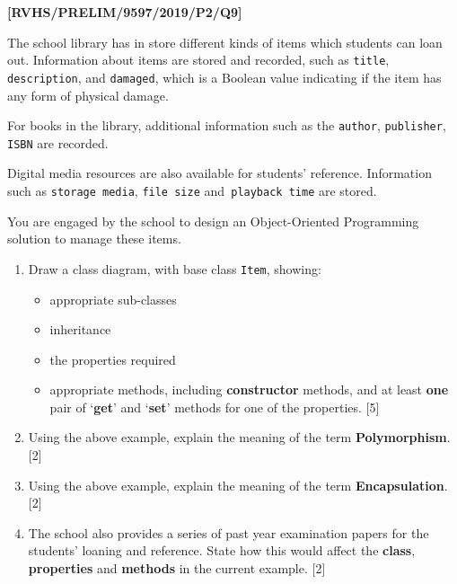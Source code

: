 \item \textbf{{[}RVHS/PRELIM/9597/2019/P2/Q9{]} }

The school library has in store different kinds of items which students
can loan out. Information about items are stored and recorded, such
as \texttt{title}, \texttt{description}, and \texttt{damaged}, which
is a Boolean value indicating if the item has any form of physical
damage.

For books in the library, additional information such as the \texttt{author},
\texttt{publisher}, \texttt{ISBN} are recorded.

Digital media resources are also available for students\textquoteright{}
reference. Information such as \texttt{storage media}, \texttt{file
size} and\texttt{ playback time} are stored. 

You are engaged by the school to design an Object-Oriented Programming
solution to manage these items.
\begin{enumerate}
\item Draw a class diagram, with base class \texttt{Item}, showing: 
\begin{itemize}
\item appropriate sub-classes 
\item inheritance
\item the properties required 
\item appropriate methods, including \textbf{constructor} methods, and at
least \textbf{one} pair of \textquoteleft \textbf{get}\textquoteright{}
and \textquoteleft \textbf{set}\textquoteright{} methods for one of
the properties. \hfill{}{[}5{]}
\end{itemize}
\item Using the above example, explain the meaning of the term \textbf{Polymorphism}.
\hfill{}{[}2{]}
\item Using the above example, explain the meaning of the term \textbf{Encapsulation}.\hfill{}
{[}2{]}
\item The school also provides a series of past year examination papers
for the students\textquoteright{} loaning and reference. State how
this would affect the \textbf{class}, \textbf{properties} and \textbf{methods}
in the current example. \hfill{}{[}2{]}
\end{enumerate}